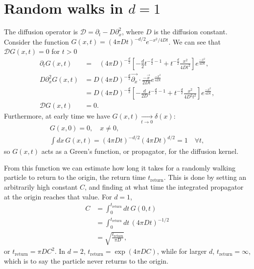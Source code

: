 \documentclass[a4paper,11pt]{article}
\newcommand{\ret}{\text{return}}
\newcommand{\nn}{\nonumber\\}
\begin{document}
\nocite{apsrev41Control}


\appendix


\section{Random walks in $d=1$} \label{sec:walks}

The diffusion operator is $\mathcal{D} = \partial_t-D\partial_x^2$, where $D$ is the diffusion constant. Consider the function $G(x,t)=(4\pi Dt)^{-d/2} e^{-x^2/4Dt}$. We can see that $\mathcal{D}G(x,t)=0$ for $t>0$ 
\begin{align}
\partial_t G(x,t) &= \phantom{D}(4\pi D)^{-\frac{d}{2}} \left[-\frac{d}{2} 
t^{-\frac{d}{2}-1} + t^{-\frac{d}{2}}\frac{x^2}{4Dt^2} \right]
e^{\frac{-x^2}{4Dt}},\\
D\partial_x^2 G(x,t) &= D(4\pi D)^{-\frac{d}{2}} \vec{\partial_x}\cdot 
\frac{-\vec{x}}{2Dt}e^{\frac{-x^2}{4Dt}} \nn
&= D(4\pi D)^{-\frac{d}{2}} \left[-\frac{d}{2D} 
t^{-\frac{d}{2}
	-1} + t^{-\frac{d}{2}}\frac{x^2}{4D^2t^2} \right]e^{\frac{-x^2}{4Dt}}, \\ 
\mathcal{D}G(x,t) &= 0.
\end{align}
Furthermore, at early time we have $G(x,t)\xrightarrow[t\to0]{}\delta(x)$:
\begin{align}
G(x,0) = 0, \quad x\ne 0,\\
\int dx\, G(x,t) = (4\pi Dt)^{-d/2}(4\pi Dt)^{d/2}=1\quad \forall t,
\end{align}
so $G(x,t)$ acts as a Green's function, or propagator, for the diffusion kernel.

From this function we can estimate how long it takes for a randomly walking particle to return to the origin, the return time $t_\ret$. This is done by setting an arbitrarily high constant $C$, and finding at what time the integrated propagator at the origin reaches that value. For $d=1$,
\begin{align}
C &= \int_{0}^{t_\ret}dt\,G(0,t)\\
&= \int_{0}^{t_\ret}dt\, (4\pi Dt)^{-1/2}\\
&= \sqrt{\frac{t_\ret}{\pi D}},
\end{align}
or $t_\ret=\pi D C^2$. In $d=2$, $t_\ret=\exp(4\pi DC)$, while for larger $d$, $t_\ret=\infty$, which is to say the particle never returns to the origin. 
\end{document}
